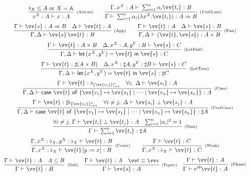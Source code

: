 \documentclass[runningheads,orivec,envcountsame,envcountsect]{llncs}
\newcommand\AbsBasis{\ensuremath{\mathbb{A}}}
\def\Pair#1#2{(#1,#2)} %
\def\Lam#1#2#3{\lambda#1^{#2}{.}#3} %
\def\letkeyword{\mathsf{let}}
\def\inkeyword{\mathsf{in}}
\def\LetP#1#2#3#4#5#6{\letkeyword\,\Pair{#1^{#2}}{#3^{#4}}=#5~\inkeyword~#6}
\def\gencase#1#2#3#4#5{\ensuremath{\mathsf{case}~#1~\mathsf{of}~\{#2\mapsto #4 \mid \dotsb \mid #3\mapsto #5\}}}
\def\Arr{\Rightarrow}
\def\SUB#1#2{#1\le#2}
\def\TYP#1#2#3{#1~{\vdash}~#2~{:}~#3}
\def\SORTH#1#2#3#4{#1~{\vdash}~#2\perp#3~{:}~#4}
\def\snam#1{\textsc{\scriptsize\upshape(#1)}}
\newcommand\basis[1]{\ensuremath{\flat_{#1}}}
\newcommand\genbasis[3]{\ensuremath{\basis{\{#1\}_{#2}^{#3}}}}
\begin{document}
\begin{table}[t]
  \[
    \begin{array}{c}
      \infer[\snam{Axiom}]{\TYP{x^{X}:A}{x}{A}}{\basis{X}\leq A \text{ or }X=\AbsBasis}
      \qquad
	\infer[\snam{UnitLam}]{\TYP{\Gamma}{\sum_{i=1}^n \alpha_i (\Lam{x}{{X}}{\vv{t_i}})}{A\Arr B}}
	{\TYP{\Gamma,x^{X}:A}{\sum_{i=1}^{n}\alpha_i\vv{t_i}}{B}}
      \\
      \noalign{\medskip}
      \infer[\snam{App}]{\TYP{\Gamma,\Delta}{\vv{s}\,\vv{t}}{B}}
      {\TYP{\Gamma}{\vv{s}}{A\Arr B} & \TYP{\Delta}{\vv{t}}{A}}
      \qquad
      \infer[\snam{Pair}]{\TYP{\Gamma,\Delta}
      {\Pair{\vv{t}}{\vv{s}}}{A\times B}}{
	\TYP{\Gamma}{\vv{t}}{A}&\TYP{\Delta}{\vv{s}}{B}
      }
      \\
      \noalign{\medskip}
      \infer[\snam{LetPair}]{\TYP{\Gamma,\Delta} 
      {\LetP{x}{{X}}{y}{{Y}}{\vv{t}}{\vv{s}}}{C}}{
	\TYP{\Gamma}{\vv{t}}{A\times B}&
	\TYP{\Delta,x^{{X}}:A,y^{Y}:B}{\vv{s}}{C}
      }\\
      \noalign{\medskip}
      \infer[\snam{LetTens}]{\TYP{\Gamma,\Delta}
      {\LetP{x}{{X}}{y}{{Y}}{\vv{t}}{\vv{s}}}{\sharp C}}{
	\TYP{\Gamma}{\vv{t}}{\sharp(A\times B)}&
	\TYP{\Delta,x^{X}:\sharp A,y^{Y}:\sharp B}{\vv{s}}{C}
      }\\
      \noalign{\medskip}
      \infer[\snam{Case}]{\TYP{\Gamma,\Delta}
      {\gencase{\vv{t}}{\vv{v_1}}{\vv{v_n}}{\vv{s_1}}{\vv{s_n}}}{A}}{
	\TYP{\Gamma}{\vv{t}}{\genbasis{\vv{v_i}}{i=1}{n}}&
	\forall i,\ \TYP{\Delta}{\vv{s_i}}{A}
      }\\
      \noalign{\medskip}
      \infer[\snam{UnitCase}]{\TYP{\Gamma,\Delta}
      {\gencase{\vv{t}}{\vv{v_1}}{\vv{v_n}}{\vv{s_1}}{\vv{s_n}}}{\sharp A}}{
	\TYP{\Gamma}{\vv{t}}{\sharp \genbasis{\vv{v_i}}{i=1}{n}}&
	\forall i\neq j,\ \SORTH{\Delta}{\vv{s_i}}{\vv{s_j}}{A}
      }\\
      \noalign{\medskip}
      \infer[\snam{Sum}]
      {\TYP{\Gamma}{\sum_{i=1}^{n} \vv{t_i}}{\sharp A}}
      {\forall i\neq j,\, \SORTH{\Gamma}{\vv{t_i}}{\vv{t_j}}{A} &
      \sum_{i=1}^{n}|\alpha_i|^2 = 1}
      \\
      \noalign{\medskip}
      \infer[\snam{Contr}]{\TYP{\Gamma,x^{X}:{\basis{X}}}{\vv{t}\,[y:=x]}{B}}{
	\TYP{\Gamma,x^{X}:{\basis{X}},y^{X}:{\basis{X}}}{\vv{t}}{B}
      } 
      \qquad
	\infer[\snam{Weak}]{\TYP{\Gamma,x^{X}:\basis{X}}{\vv{t}}{C}}{
	  \TYP{\Gamma}{\vv{t}}{C}
	}
      \\
      \noalign{\medskip}
      \infer[\snam{Sub}]{\TYP{\Gamma}{\vv{t}}{B}}{\TYP{\Gamma}{\vv{t}}{A} & \SUB{A}{B}}
      \quad
      \infer[\snam{Equiv}]{\TYP{\Gamma}{\vv{s}}{A}}{
	\TYP{\Gamma}{\vv{t}}{A}& \vv t\equiv \vv s
      }
      \quad 
      \infer[\snam{Phase}]{\TYP{\Gamma}{e^{i\theta}\vv{t}}{A}}
      {\TYP{\Gamma}{\vv{t}}{A}}
    \end{array}
  \]
  \caption{Some valid typing rules}
  \label{tab:TypingRules}
\end{table}
\end{document}
